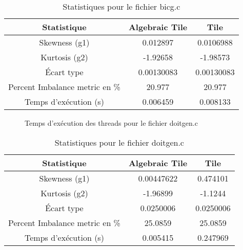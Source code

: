 \documentclass{article}
\begin{document}
\begin{table}[htbp]
  \centering
  \caption{Statistiques pour le fichier bicg.c}
  \begin{tabular}{|c|c|c|}
    \hline
    Statistique & Algebraic Tile & Tile \\ 
    \hline
    Skewness (g1) & 0.012897 & 0.0106988 \\ 
    Kurtosis (g2) & -1.92658 & -1.98573 \\ 
    Écart type & 0.00130083 & 0.00130083 \\ 
    Percent Imbalance metric en \% & 20.977 & 20.977 \\ 
    Temps d'exécution (s) &  0.006459      &  0.008133    \\ 
    \hline
  \end{tabular}
\end{table}
\newpage

\begin{figure}
  \centering
  \caption{Temps d'exécution des threads pour le fichier doitgen.c}
  \label{fig:doitgen.c}
\end{figure}

\begin{table}[htbp]
  \centering
  \caption{Statistiques pour le fichier doitgen.c}
  \begin{tabular}{|c|c|c|}
    \hline
    Statistique & Algebraic Tile & Tile \\ 
    \hline
    Skewness (g1) & 0.00447622 & 0.474101 \\ 
    Kurtosis (g2) & -1.96899 & -1.1244 \\ 
    Écart type & 0.0250006 & 0.0250006 \\ 
    Percent Imbalance metric en \% & 25.0859 & 25.0859 \\ 
    Temps d'exécution (s) &  0.005415      &  0.247969    \\ 
    \hline
  \end{tabular}
\end{table}
\newpage
\end{document}
